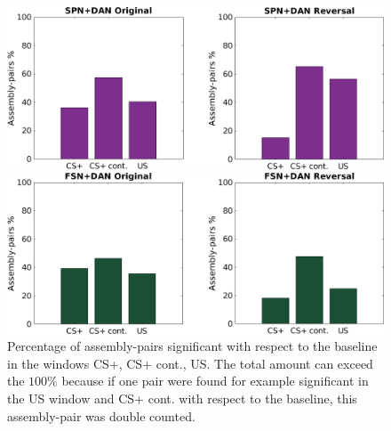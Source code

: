  \begin{figure}
    \centering
    \includegraphics[scale=0.36]{figures/SPN_DANHisto.png}
    
    \vspace{1cm}
    
    \includegraphics[scale=0.36]{figures/FSN_DANHisto.png}
\caption{Percentage of assembly-pairs significant with respect to the baseline in the windows CS+, CS+ cont., US. The total amount can exceed the $100\%$ because if  one pair were found for example significant in the US window and CS+ cont. with respect to the baseline, this assembly-pair was double counted.}
    \label{fig:FriedHistoDAN}
\end{figure}
